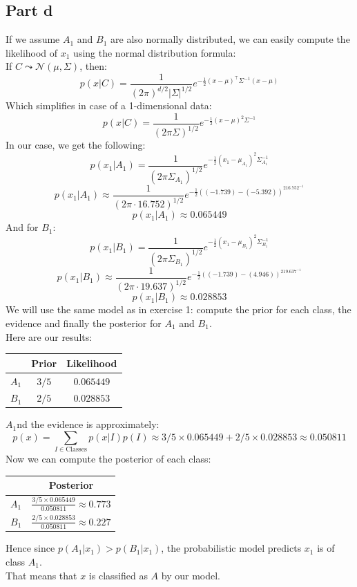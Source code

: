 \documentclass[a4paper, 10pt]{article}
\begin{document}
\subsection{Part d}
If we assume $A_1$ and $B_1$ are also normally distributed, we can easily compute the likelihood of 
$x_1$ using the normal distribution formula:
\\
If $C\leadsto\mathcal{N}(\mu, \Sigma)$, then:
$$
p(x\vert C) = \frac{1}{(2\pi)^{d/2}\vert\Sigma\vert^{1/2}}e^{-\frac{1}{2}(x-\mu)^\top\Sigma^{-1}(x-\mu)}
$$
Which simplifies in case of a 1-dimensional data:
$$
p(x\vert C) = \frac{1}{(2\pi\Sigma)^{1/2}}e^{-\frac{1}{2}(x-\mu)^2\Sigma^{-1}}
$$
In our case, we get the following:
$$
p(x_1\vert A_1) = \frac{1}{(2\pi\Sigma_{A_1})^{1/2}}e^{-\frac{1}{2}(x_1-\mu_{A_1})^2\Sigma_{A_1}^{-1}}
$$
$$
p(x_1\vert A_1) \approx \frac{1}{(2\pi\cdot16.752)^{1/2}}e^{-\frac{1}{2}((-1.739)-(-5.392))^216.752^{-1}}
$$
$$
p(x_1\vert A_1) \approx 0.065449
$$
And for $B_1$:
$$
p(x_1\vert B_1) = \frac{1}{(2\pi\Sigma_{B_1})^{1/2}}e^{-\frac{1}{2}(x_1-\mu_{B_1})^2\Sigma_{B_1}^{-1}}
$$
$$
p(x_1\vert B_1) \approx \frac{1}{(2\pi\cdot19.637)^{1/2}}e^{-\frac{1}{2}((-1.739)-(4.946))^219.637^{-1}}
$$
$$
p(x_1\vert B_1) \approx 0.028853
$$
We will use the same model as in exercise 1: compute the prior for each class, the evidence and finally the posterior for $A_1$ and $B_1$.
\\
Here are our results:
\begin{center}
\begin{tabular}{ |c|c|c| }
    \hline
    \  & Prior & Likelihood \\
    \hline
    $A_1$ & $3/5$ & $0.065449$ \\
    \hline
    $B_1$ & $2/5$ & $0.028853$ \\
    \hline
\end{tabular}
\end{center}
$A_1$nd the evidence is approximately:
$$
p(x) =  \sum_{I\in \text{Classes}} p(x\vert I)p(I) \approx 3/5\times 0.065449 + 2/5\times 0.028853 \approx 0.050811
$$
Now we can compute the posterior of each class:
\begin{center}
\begin{tabular}{ |c|c| }
    \hline
    \  & Posterior \\
    \hline
    $A_1$ & $\frac{3/5\times0.065449}{0.050811}\approx0.773$\\
    \hline
    $B_1$ & $\frac{2/5\times0.028853}{0.050811}\approx0.227$\\
    \hline
\end{tabular}
\end{center}
Hence since $p(A_1\vert x_1) > p(B_1\vert x_1)$, the probabilistic model predicts $x_1$ is of class $A_1$.
\\
That means that $x$ is classified as $A$ by our model.
\end{document}
